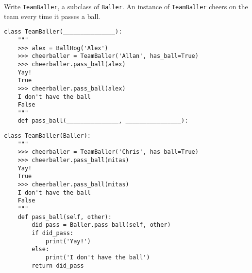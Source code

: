 \begin{blocksection}
\question Write \lstinline$TeamBaller$, a subclass of \lstinline$Baller$. An instance of \lstinline$TeamBaller$ cheers on the team every time it passes a ball.

\ifprintanswers\else
\begin{lstlisting}
class TeamBaller(_______________):
    """
    >>> alex = BallHog('Alex')
    >>> cheerballer = TeamBaller('Allan', has_ball=True)
    >>> cheerballer.pass_ball(alex)
    Yay!
    True
    >>> cheerballer.pass_ball(alex)
    I don't have the ball
    False
    """
    def pass_ball(_______________, ________________):
\end{lstlisting}
\fi

\begin{solution}[1in]
\begin{lstlisting}
class TeamBaller(Baller):
    """
    >>> cheerballer = TeamBaller('Chris', has_ball=True)
    >>> cheerballer.pass_ball(mitas)
    Yay!
    True
    >>> cheerballer.pass_ball(mitas)
    I don't have the ball
    False
    """
    def pass_ball(self, other):
        did_pass = Baller.pass_ball(self, other)
        if did_pass:
            print('Yay!')
        else:
            print('I don't have the ball')
        return did_pass
\end{lstlisting}
\end{solution}
\end{blocksection}
